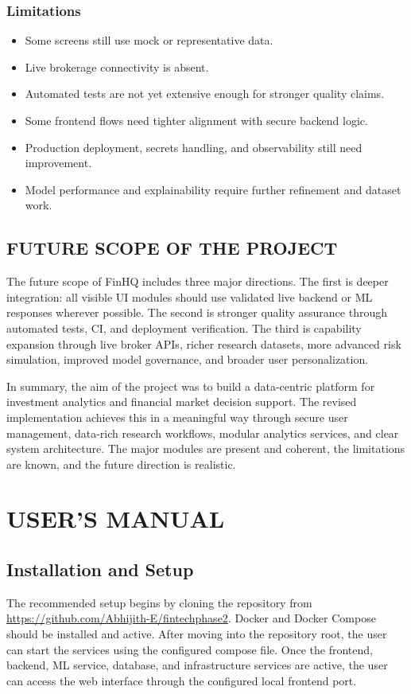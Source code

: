 \documentclass[12pt,a4paper]{report}
\newcommand{\projectshort}{FinHQ}
\newcommand{\repolink}{https://github.com/Abhijith-E/fintechphase2}
\begin{document}
\subsection{Limitations}
\begin{itemize}
\item Some screens still use mock or representative data.
\item Live brokerage connectivity is absent.
\item Automated tests are not yet extensive enough for stronger quality claims.
\item Some frontend flows need tighter alignment with secure backend logic.
\item Production deployment, secrets handling, and observability still need improvement.
\item Model performance and explainability require further refinement and dataset work.
\end{itemize}

\section{FUTURE SCOPE OF THE PROJECT}
The future scope of \projectshort{} includes three major directions. The first is deeper integration: all visible UI modules should use validated live backend or ML responses wherever possible. The second is stronger quality assurance through automated tests, CI, and deployment verification. The third is capability expansion through live broker APIs, richer research datasets, more advanced risk simulation, improved model governance, and broader user personalization.

In summary, the aim of the project was to build a data-centric platform for investment analytics and financial market decision support. The revised implementation achieves this in a meaningful way through secure user management, data-rich research workflows, modular analytics services, and clear system architecture. The major modules are present and coherent, the limitations are known, and the future direction is realistic.

\appendix
\chapter{USER'S MANUAL}
\section{Installation and Setup}
The recommended setup begins by cloning the repository from \url{\repolink}. Docker and Docker Compose should be installed and active. After moving into the repository root, the user can start the services using the configured compose file. Once the frontend, backend, ML service, database, and infrastructure services are active, the user can access the web interface through the configured local frontend port.
\end{document}
